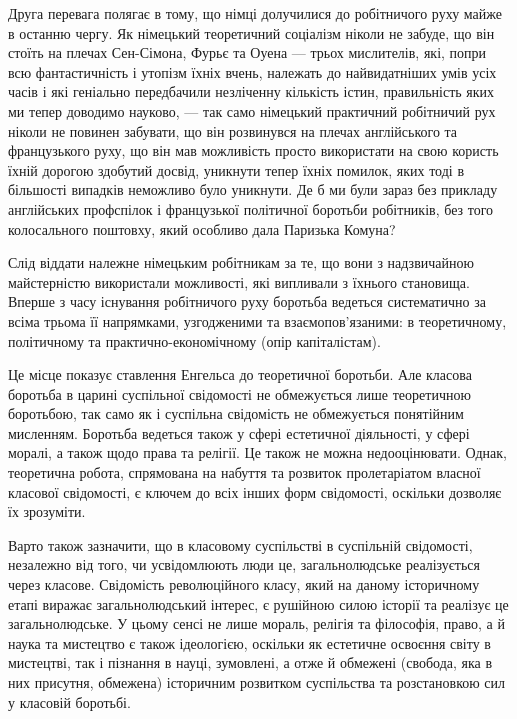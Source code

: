 \documentclass[../main]{subfiles}
\begin{document}
Друга перевага полягає в тому, що німці долучилися до робітничого руху майже в останню чергу. Як німецький теоретичний соціалізм ніколи не забуде, що він стоїть на плечах Сен-Сімона, Фурьє та Оуена — трьох мислителів, які, попри всю фантастичність і утопізм їхніх вчень, належать до найвидатніших умів усіх часів і які геніально передбачили незліченну кількість істин, правильність яких ми тепер доводимо науково, — так само німецький практичний робітничий рух ніколи не повинен забувати, що він розвинувся на плечах англійського та французького руху, що він мав можливість просто використати на свою користь їхній дорогою здобутий досвід, уникнути тепер їхніх помилок, яких тоді в більшості випадків неможливо було уникнути. Де б ми були зараз без прикладу англійських профспілок і французької політичної боротьби робітників, без того колосального поштовху, який особливо дала Паризька Комуна?

Слід віддати належне німецьким робітникам за те, що вони з надзвичайною майстерністю використали можливості, які випливали з їхнього становища. Вперше з часу існування робітничого руху боротьба ведеться систематично за всіма трьома її напрямками, узгодженими та взаємопов’язаними: в теоретичному, політичному та практично-економічному (опір капіталістам).

Це місце показує ставлення Енгельса до теоретичної боротьби. Але класова боротьба в царині суспільної свідомості не обмежується лише теоретичною боротьбою, так само як і суспільна свідомість не обмежується понятійним мисленням. Боротьба ведеться також у сфері естетичної діяльності, у сфері моралі, а також щодо права та релігії. Це також не можна недооцінювати. Однак, теоретична робота, спрямована на набуття та розвиток пролетаріатом власної класової свідомості, є ключем до всіх інших форм свідомості, оскільки дозволяє їх зрозуміти.

Варто також зазначити, що в класовому суспільстві в суспільній свідомості, незалежно від того, чи усвідомлюють люди це, загальнолюдське реалізується через класове. Свідомість революційного класу, який на даному історичному етапі виражає загальнолюдський інтерес, є рушійною силою історії та реалізує це загальнолюдське. У цьому сенсі не лише мораль, релігія та філософія, право, а й наука та мистецтво є також ідеологією, оскільки як естетичне освоєння світу в мистецтві, так і пізнання в науці, зумовлені, а отже й обмежені (свобода, яка в них присутня, обмежена) історичним розвитком суспільства та розстановкою сил у класовій боротьбі.
\end{document}
